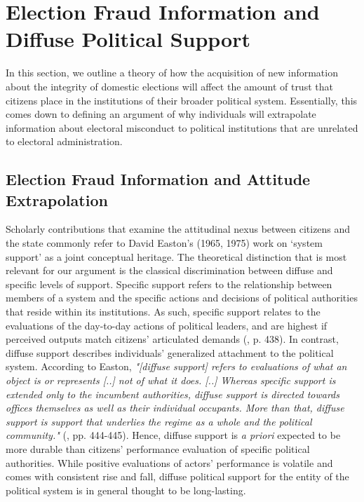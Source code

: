 \documentclass[11pt, ngerman,english,a4]{article}
\begin{document}
\section*{Election Fraud Information and Diffuse Political Support}

In this section, we outline a theory of how the acquisition of new information about the integrity of domestic elections will affect the amount of trust that citizens place in the institutions of their broader political system. Essentially, this comes down to defining an argument of why individuals will extrapolate information about electoral misconduct to political institutions that are unrelated to electoral administration. 

\subsection*{Election Fraud Information and Attitude Extrapolation}

Scholarly contributions that examine the attitudinal nexus between citizens and the state commonly refer to David Easton's (1965, 1975) work on ‘system support’ as a joint conceptual heritage. The theoretical distinction that is most relevant for our argument is the classical discrimination between diffuse and specific levels of support. Specific support refers to the relationship between members of a system and the specific actions and decisions of political authorities that reside within its institutions. As such, specific support relates to the evaluations of the day-to-day actions of political leaders, and are highest if perceived outputs match citizens’ articulated demands (\citealt{Easton1975}, p. 438). In contrast, diffuse support describes individuals’ generalized attachment to the political system. According to Easton, \textit{"[diffuse support] refers to evaluations of what an object is or represents [..] not of what it does. [..] Whereas specific support is extended only to the incumbent authorities, diffuse support is directed towards offices themselves as well as their individual occupants. More than that, diffuse support is support that underlies the regime as a whole and the political community."} (\citealt{Easton1975}, pp. 444-445). Hence, diffuse support is \textit{a priori} expected to be more durable than citizens’ performance evaluation of specific political authorities. While positive evaluations of actors’ performance is volatile and comes with consistent rise and fall, diffuse political support for the entity of the political system is in general thought to be long-lasting. 
\end{document}
